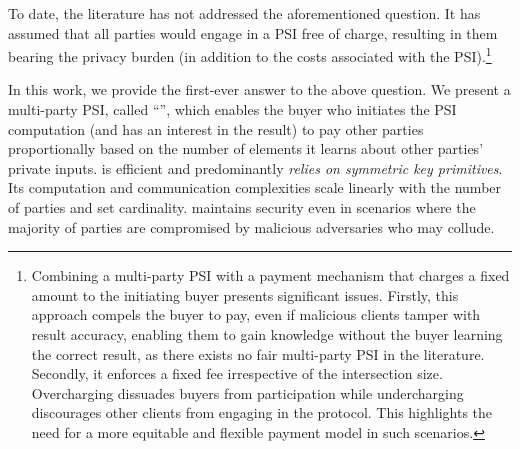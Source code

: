 To date, the literature has not addressed the aforementioned question. It has assumed that all parties would engage in a PSI free of charge, resulting in them bearing the privacy burden (in addition to the costs associated with the PSI).\footnote{Combining a multi-party PSI with a payment mechanism that charges a fixed amount to the initiating buyer presents significant issues. Firstly, this approach compels the buyer to pay, even if malicious clients tamper with result accuracy, enabling them to gain knowledge without the buyer learning the correct result, as there exists no fair multi-party PSI in the literature. Secondly, it enforces a fixed fee irrespective of the intersection size. Overcharging dissuades buyers from participation while undercharging discourages other clients from engaging in the protocol. This highlights the need for a more equitable and flexible payment model in such scenarios.}


%
In this work, we provide the first-ever answer to the above question. We present a multi-party PSI, called ``\withRew'', which enables the buyer who initiates the PSI computation (and has an interest in the result) to pay other parties proportionally based on the number of elements it learns about other parties' private inputs. 
%
%
\withRew is efficient and predominantly \emph{relies on symmetric key primitives}.  Its computation and communication complexities  scale linearly with  the number of parties and set cardinality. \withRew maintains security even in scenarios where the majority of parties are compromised by malicious adversaries who may collude.




